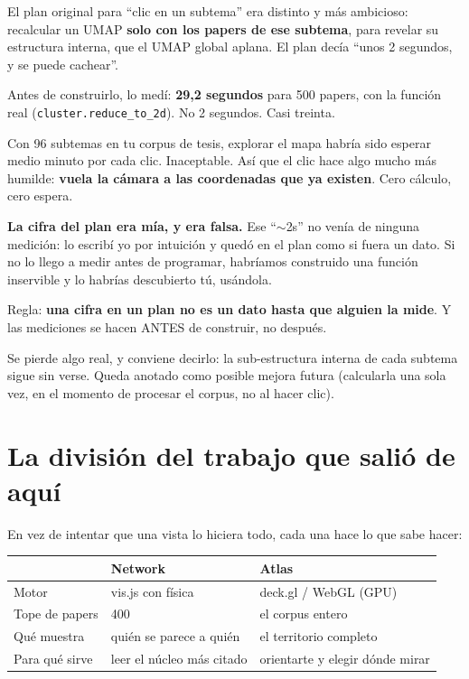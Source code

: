 \documentclass[11pt,a4paper]{article}
\begin{document}
El plan original para ``clic en un subtema'' era distinto y más ambicioso: recalcular un
UMAP \textbf{solo con los papers de ese subtema}, para revelar su estructura interna, que
el UMAP global aplana. El plan decía ``unos 2 segundos, y se puede cachear''.

Antes de construirlo, lo medí: \textbf{29,2 segundos} para 500 papers, con la función
real (\texttt{cluster.reduce\_to\_2d}). No 2 segundos. Casi treinta.

Con 96 subtemas en tu corpus de tesis, explorar el mapa habría sido esperar medio minuto
por cada clic. Inaceptable. Así que el clic hace algo mucho más humilde: \textbf{vuela la
cámara a las coordenadas que ya existen}. Cero cálculo, cero espera.

\begin{ojo}
\textbf{La cifra del plan era mía, y era falsa.} Ese ``$\sim$2s'' no venía de ninguna medición: lo escribí yo por intuición y quedó en el
plan como si fuera un dato. Si no lo llego a medir antes de programar, habríamos
construido una función inservible y lo habrías descubierto tú, usándola.

Regla: \textbf{una cifra en un plan no es un dato hasta que alguien la mide}. Y las
mediciones se hacen ANTES de construir, no después.
\end{ojo}

Se pierde algo real, y conviene decirlo: la sub-estructura interna de cada subtema sigue
sin verse. Queda anotado como posible mejora futura (calcularla una sola vez, en el
momento de procesar el corpus, no al hacer clic).

\section{La división del trabajo que salió de aquí}

En vez de intentar que una vista lo hiciera todo, cada una hace lo que sabe hacer:

\begin{center}
\begin{tabular}{lll}
\hline
 & \textbf{Network} & \textbf{Atlas} \\
\hline
Motor          & vis.js con física   & deck.gl / WebGL (GPU) \\
Tope de papers & 400                 & el corpus entero \\
Qué muestra    & quién se parece a quién & el territorio completo \\
Para qué sirve & leer el núcleo más citado & orientarte y elegir dónde mirar \\
\hline
\end{tabular}
\end{center}
\end{document}
